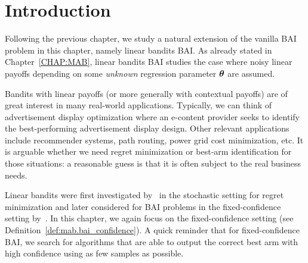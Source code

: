 \section{Introduction}\label{sec:lgc.intro}


Following the previous chapter, we study a natural extension of the vanilla BAI problem in this chapter, namely linear bandits BAI. As already stated in Chapter~\ref{CHAP:MAB}, linear bandits BAI studies the case where noisy linear payoffs depending on some \emph{unknown} regression parameter ${\boldsymbol \theta}$ are assumed.

Bandits with linear payoffs (or more generally with contextual payoffs) are of great interest in many real-world applications. Typically, we can think of advertisement display optimization where an e-content provider seeks to identify the best-performing advertisement display design. Other relevant applications include recommender systems, path routing, power grid cost minimization, etc. It is arguable whether we need regret minimization or best-arm identification for those situations: a reasonable guess is that it is often subject to the real business needs.

Linear bandits were first investigated by~\citet{auer2002linear} in the stochastic setting for regret minimization and later considered for BAI problems in the fixed-confidence setting by~\citet{soare2014linear}. In this chapter, we again focus on the fixed-confidence setting (see Definition~\ref{def:mab.bai_confidence}). A quick reminder that for fixed-confidence BAI, we search for algorithms that are able to output the correct best arm with high confidence using as few samples as possible.


